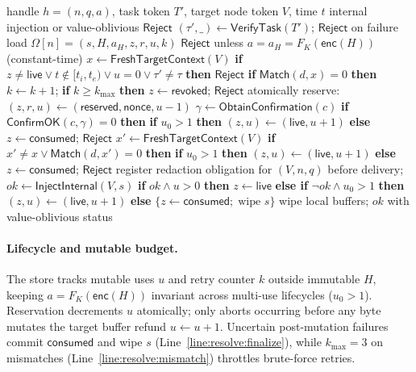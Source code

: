 \documentclass[sigconf,10pt]{acmart}
\newcommand{\SH}{\textsc{SecretHandle}}
\newcommand{\Enter}{\ensuremath{\mathsf{Enter}}}
\newcommand{\Reject}{\ensuremath{\mathsf{Reject}}}
\newcommand{\Match}{\ensuremath{\mathsf{Match}}}
\newcommand{\enc}{\ensuremath{\mathsf{enc}}}
\theoremstyle{acmplain}%
\begin{document}
\begin{algorithm}[t]
\caption{\SH{} \Enter/Resolve}
\label{alg:resolve}
\begin{algorithmic}[1]
\Require handle $h=(n,q,a)$, task token $T'$, target node token $V$, time $t$
\Ensure internal injection or value-oblivious $\Reject$
\State $(\tau',\_)\gets\mathsf{VerifyTask}(T')$; \Return $\Reject$ on failure
\State load $\Omega[n]=(s,H,a_H,z,r,u,k)$
\State \Return $\Reject$ unless $a=a_H=F_K(\enc(H))$ (constant-time)
\State $x\gets\mathsf{FreshTargetContext}(V)$
\State \label{line:resolve:guard}\textbf{if} $z\ne\mathsf{live} \lor t\notin[t_i,t_e) \lor u=0 \lor \tau'\ne\tau$ \textbf{then} \Return $\Reject$
\State \label{line:resolve:mismatch}\textbf{if} $\Match(d,x)=0$ \textbf{then} $k\gets k+1$; \textbf{if} $k\ge k_{\max}$ \textbf{then} $z\gets\mathsf{revoked}$; \Return $\Reject$
\State \label{line:resolve:reserve}atomically reserve: $(z,r,u)\gets(\mathsf{reserved},\mathsf{nonce},u-1)$
\State $\gamma\gets\mathsf{ObtainConfirmation}(c)$
\State \label{line:resolve:confirm}\textbf{if} $\mathsf{ConfirmOK}(c,\gamma)=0$ \textbf{then} \textbf{if} $u_0 > 1$ \textbf{then} $(z, u) \gets (\mathsf{live}, u + 1)$ \textbf{else} $z \gets \mathsf{consumed}$; \Return $\Reject$
\State $x'\gets\mathsf{FreshTargetContext}(V)$
\State \label{line:resolve:revalidate}\textbf{if} $x'\ne x \lor \Match(d,x')=0$ \textbf{then} \textbf{if} $u_0 > 1$ \textbf{then} $(z, u) \gets (\mathsf{live}, u + 1)$ \textbf{else} $z \gets \mathsf{consumed}$; \Return $\Reject$
\State register redaction obligation for $(V,n,q)$ before delivery; $ok\gets\mathsf{InjectInternal}(V,s)$
\State \label{line:resolve:finalize}\textbf{if} $ok \land u>0$ \textbf{then} $z\gets\mathsf{live}$ \textbf{else if} $\neg ok \land u_0>1$ \textbf{then} $(z,u)\gets(\mathsf{live},u+1)$ \textbf{else} $\{z\gets\mathsf{consumed};\; \text{wipe } s\}$
\State wipe local buffers; \Return $ok$ with value-oblivious status
\end{algorithmic}
\end{algorithm}

\paragraph{Lifecycle and mutable budget.} The store tracks mutable uses $u$ and retry counter $k$ outside immutable $H$, keeping $a = F_K(\enc(H))$ invariant across multi-use lifecycles ($u_0 > 1$). Reservation decrements $u$ atomically; only aborts occurring before any byte mutates the target buffer refund $u \gets u + 1$. Uncertain post-mutation failures commit $\mathsf{consumed}$ and wipe $s$ (Line~\ref{line:resolve:finalize}), while $k_{\max}=3$ on mismatches (Line~\ref{line:resolve:mismatch}) throttles brute-force retries.
\end{document}
